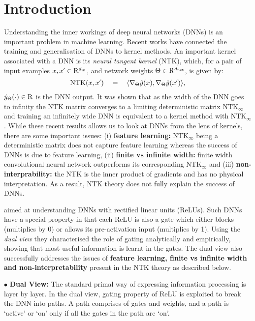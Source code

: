 \section{Introduction}
Understanding the inner workings of deep neural networks (DNNs) is an important problem in machine learning. Recent works  have connected the training and generalisation of DNNs to kernel methods. An important kernel associated with a DNN is its \emph{neural tangent kernel} (NTK), which, for a pair of input examples $x,x'\in\mathrm{R}^{d_{\text{in}}}$, and network weights $\Theta\in\mathrm{R}^{d_{\text{net}}}$, is given by:
\begin{align*}
 \text{NTK}(x,x')\quad = \quad \langle \nabla_{\Theta}\hat{y}(x), \nabla_{\Theta}\hat{y}(x')\rangle, 
\end{align*}
$\hat{y}_\Theta(\cdot)\in\mathrm{R}$ is the DNN output. It was shown that as the width of the DNN goes to infinity the NTK matrix converges to a limiting deterministic matrix $\text{NTK}_{\infty}$ and training an infinitely wide DNN is equivalent to a kernel method with $\text{NTK}_{\infty}$. While these recent results allows us to look at DNNs from the lens of kernels, there are some important issues: (i) \textbf{feature learning:} $\text{NTK}_{\infty}$ being a deterministic matrix does not capture feature learning whereas the success of DNNs is due to feature learning, (ii) \textbf{finite vs infinite width:} finite width convolutional neural network outperforms its corresponding $\text{NTK}_{\infty}$ and (iii)  \textbf{non-interprability:} the NTK is the inner product of gradients and has no physical interpretation. As a result, NTK theory does not fully explain the success of DNNs.

 \cite{npk} aimed at understanding DNNs with rectified linear units (ReLUs). Such DNNs have a special property in that each ReLU is also a gate which either blocks (multiplies by 0) or allows its pre-activation input (multiplies by 1). 
 Using the \emph{dual view} they characterised the role of gating analytically and empirically, showing that most useful information is learnt in the gates. The dual view also successfully addresses the issues of \textbf{feature learning, finite vs infinite width and non-interpretability} present in the NTK theory as described below.

$\bullet$ \textbf{Dual View:}  The standard primal way of expressing information processing is layer by layer.  In the dual view, gating property of ReLU is exploited to break the DNN into paths. A path comprises of gates and weights, and a path is `active' or `on' only if all the gates in the path are `on'. %


